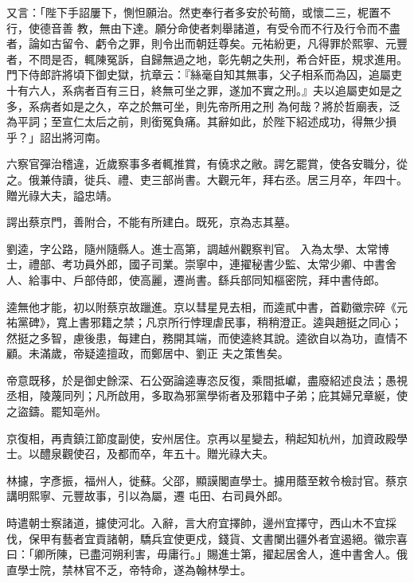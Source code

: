 \begin{pinyinscope}
 又言：「陛下手詔屢下，惻怛願治。然吏奉行者多安於茍簡，或懷二三，柅置不行，使德音善
 教，無由下達。願分命使者刺舉諸道，有受令而不行及行令而不盡者，論如古留令、虧令之罪，則令出而朝廷尊矣。元祐紛更，凡得罪於熙寧、元豐者，不問是否，輒陳冤訴，自歸無過之地，彰先朝之失刑，希合奸臣，規求進用。門下侍郎許將頃下御史獄，抗章云：『絲毫自知其無事，父子相系而為囚，追屬吏十有六人，系病者百有三日，終無可坐之罪，遂加不實之刑。』夫以追屬吏如是之多，系病者如是之久，卒之於無可坐，則先帝所用之刑
 為何哉？將於哲廟表，泛為平詞；至宣仁太后之前，則銜冤負痛。其辭如此，於陛下紹述成功，得無少損乎？」詔出將河南。



 六察官彈治稽違，近歲察事多者輒推賞，有僥求之敝。諤乞罷賞，使各安職分，從之。俄兼侍讀，徙兵、禮、吏三部尚書。大觀元年，拜右丞。居三月卒，年四十。贈光祿大夫，謚忠靖。



 諤出蔡京門，善附合，不能有所建白。既死，京為志其墓。



 劉逵，字公路，隨州隨縣人。進士高第，調越州觀察判官。
 入為太學、太常博士，禮部、考功員外郎，國子司業。崇寧中，連擢秘書少監、太常少卿、中書舍人、給事中、戶部侍郎，使高麗，遷尚書。繇兵部同知樞密院，拜中書侍郎。



 逵無他才能，初以附蔡京故躐進。京以彗星見去相，而逵貳中書，首勸徽宗碎《元祐黨碑》，寬上書邪籍之禁；凡京所行悖理虐民事，稍稍澄正。逵與趙挺之同心；然挺之多智，慮後患，每建白，務開其端，而使逵終其說。逵欲自以為功，直情不顧。未滿歲，帝疑逵擅政，而鄭居中、劉正
 夫之策售矣。



 帝意既移，於是御史餘深、石公弼論逵專恣反復，乘間抵巘，盡廢紹述良法；愚視丞相，陵蔑同列；凡所啟用，多取為邪黨學術者及邪籍中子弟；庇其婦兄章綖，使之盜鑄。罷知亳州。



 京復相，再責鎮江節度副使，安州居住。京再以星變去，稍起知杭州，加資政殿學士。以醴泉觀使召，及都而卒，年五十。贈光祿大夫。



 林攄，字彥振，福州人，徙蘇。父邵，顯謨閣直學士。攄用蔭至敕令檢討官。蔡京講明熙寧、元豐故事，引以為屬，遷
 屯田、右司員外郎。



 時遣朝士察諸道，攄使河北。入辭，言大府宜擇帥，邊州宜擇守，西山木不宜採伐，保甲有藝者宜貢諸朝，驕兵宜使更戍，錢貨、文書闌出疆外者宜遏絕。徽宗喜曰：「卿所陳，已盡河朔利害，毋庸行。」賜進士第，擢起居舍人，進中書舍人。俄直學士院，禁林官不乏，帝特命，遂為翰林學士。




\end{pinyinscope}
